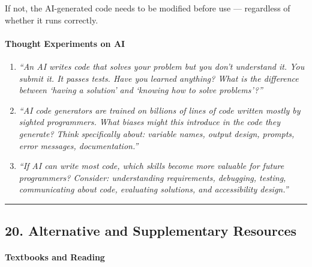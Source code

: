 \documentclass[
  justified,
  openright,
]{tufte-book}
\let\subsubsection\paragraph
\let\paragraph\paragraph
\let\subsubsection\paragraph
\let\paragraph\paragraph
\begin{document}
If not, the AI-generated code needs to be modified before use ---
regardless of whether it runs correctly.

\subsubsection{Thought Experiments on
AI}\label{thought-experiments-on-ai}

\begin{enumerate}
\def\labelenumi{\arabic{enumi}.}
\item
  \emph{``An AI writes code that solves your problem but you don't
  understand it. You submit it. It passes tests. Have you learned
  anything? What is the difference between `having a solution' and
  `knowing how to solve problems'?''}
\item
  \emph{``AI code generators are trained on billions of lines of code
  written mostly by sighted programmers. What biases might this
  introduce in the code they generate? Think specifically about:
  variable names, output design, prompts, error messages,
  documentation.''}
\item
  \emph{``If AI can write most code, which skills become more valuable
  for future programmers? Consider: understanding requirements,
  debugging, testing, communicating about code, evaluating solutions,
  and accessibility design.''}
\end{enumerate}

\begin{center}\rule{0.5\linewidth}{0.5pt}\end{center}

\subsection{20. Alternative and Supplementary
Resources}\label{alternative-and-supplementary-resources}

\subsubsection{Textbooks and Reading}\label{textbooks-and-reading}
\end{document}
